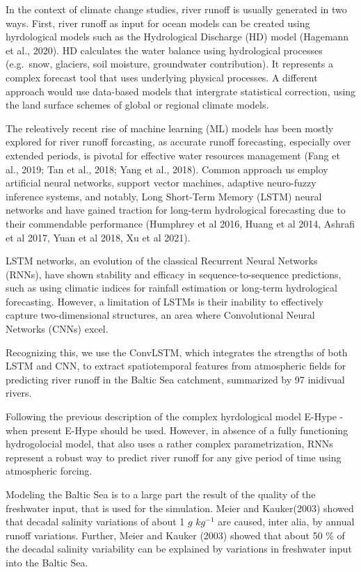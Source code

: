 \documentclass[
]{agujournal2019}
\begin{document}
In the context of climate change studies, river runoff is usually
generated in two ways. First, river runoff as input for ocean models can
be created using hyrdological models such as the Hydrological Discharge
(HD) model (Hagemann et al., 2020). HD calculates the water balance
using hydrological processes (e.g.~snow, glaciers, soil moisture,
groundwater contribution). It represents a complex forecast tool that
uses underlying physical processes. A different approach would use
data-based models that intergrate statistical correction, using the land
surface schemes of global or regional climate models.

The releatively recent rise of machine learning (ML) models has been
mostly explored for river runoff forcasting, as accurate runoff
forecasting, especially over extended periods, is pivotal for effective
water resources management (Fang et al., 2019; Tan et al., 2018; Yang et
al., 2018). Common approach us employ artificial neural networks,
support vector machines, adaptive neuro-fuzzy inference systems, and
notably, Long Short-Term Memory (LSTM) neural networks and have gained
traction for long-term hydrological forecasting due to their commendable
performance (Humphrey et al 2016, Huang et al 2014, Ashrafi et al 2017,
Yuan et al 2018, Xu et al 2021).

LSTM networks, an evolution of the classical Recurrent Neural Networks
(RNNs), have shown stability and efficacy in sequence-to-sequence
predictions, such as using climatic indices for rainfall estimation or
long-term hydrological forecasting. However, a limitation of LSTMs is
their inability to effectively capture two-dimensional structures, an
area where Convolutional Neural Networks (CNNs) excel.

Recognizing this, we use the ConvLSTM, which integrates the strengths of
both LSTM and CNN, to extract spatiotemporal features from atmospheric
fields for predicting river runoff in the Baltic Sea catchment,
summarized by 97 inidivual rivers.

Following the previous description of the complex hyrdological model
E-Hype - when present E-Hype should be used. However, in absence of a
fully functioning hydrogolocial model, that also uses a rather complex
parametrization, RNNs represent a robust way to predict river runoff for
any give period of time using atmospheric forcing.

Modeling the Baltic Sea is to a large part the result of the quality of
the freshwater input, that is used for the simulation. Meier and
Kauker(2003) showed that decadal salinity variations of about 1 \(g\)
\(kg^{-1}\) are caused, inter alia, by annual runoff variations.
Further, Meier and Kauker (2003) showed that about 50 \% of the decadal
salinity variability can be explained by variations in freshwater input
into the Baltic Sea.
\end{document}

